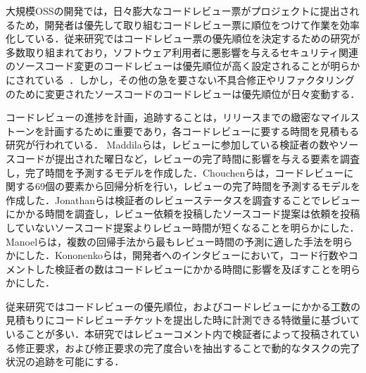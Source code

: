 \documentclass[11pt]{jreport}
\newcommand{\todo}[1]{\colorbox{yellow}{{\bf TODO}:}{\color{red} {\textbf{[#1]}}}}
\begin{document}
大規模OSSの開発では，日々膨大なコードレビュー票がプロジェクトに提出されるため，開発者は優先して取り組むコードレビュー票に順位をつけて作業を効率化している．従来研究ではコードレビュー票の優先順位を決定するための研究が多数取り組まれており，ソフトウェア利用者に悪影響を与えるセキュリティ関連のソースコード変更のコードレビューは優先順位が高く設定されることが明らかにされている~\cite{integrator}\cite{review_prioritize_pineapple}．しかし，その他の急を要さない不具合修正やリファクタリングのために変更されたソースコードのコードレビューは優先順位が日々変動する\cite{review_priority_next_day}．

コードレビューの進捗を計画，追跡することは，リリースまでの緻密なマイルストーンを計画するために重要であり，各コードレビューに要する時間を見積もる研究が行われている．
Maddilaらは，レビューに参加している検証者の数やソースコードが提出された曜日など，レビューの完了時間に影響を与える要素を調査し，完了時間を予測するモデルを作成した\cite{estimate_time1}\cite{estimate_time2}．Chouchenらは，コードレビューに関する69個の要素から回帰分析を行い，レビューの完了時間を予測するモデルを作成した\cite{estimate_time3}．Jonathanらは検証者のレビューステータスを調査することでレビューにかかる時間を調査し，レビュー依頼を投稿したソースコード提案は依頼を投稿していないソースコード提案よりレビュー時間が短くなることを明らかにした\cite{estimate_time4}．Manoelらは，複数の回帰手法から最もレビュー時間の予測に適した手法を明らかにした\cite{estimate_time5}．Kononenkoらは，開発者へのインタビューにおいて，コード行数やコメントした検証者の数はコードレビューにかかる時間に影響を及ぼすことを明らかにした\cite{release_merge}．

従来研究ではコードレビューの優先順位，およびコードレビューにかかる工数の見積もりにコードレビューチケットを提出した時に計測できる特徴量に基づいていることが多い．本研究ではレビューコメント内で検証者によって投稿されている修正要求，および修正要求の完了度合いを抽出することで動的なタスクの完了状況の追跡を可能にする．


\end{document}
